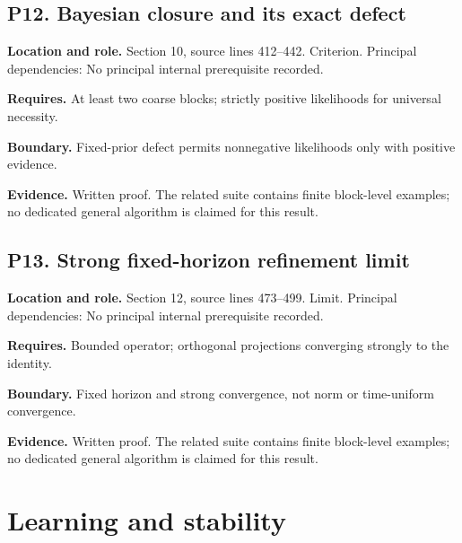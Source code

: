 \documentclass[11pt,letterpaper]{article}
\begin{document}
\par\noindent\begin{minipage}{\textwidth}
\subsection{P12. Bayesian closure and its exact
defect}\label{p12.-bayesian-closure-and-its-exact-defect}

\textbf{Location and role.} Section 10, source lines 412--442.
Criterion. Principal dependencies: No principal internal prerequisite
recorded.

\textbf{Requires.} At least two coarse blocks; strictly positive
likelihoods for universal necessity.

\textbf{Boundary.} Fixed-prior defect permits nonnegative likelihoods
only with positive evidence.

\textbf{Evidence.} Written proof. The related suite contains finite
block-level examples; no dedicated general algorithm is claimed for this
result.
\end{minipage}\par\medskip

\par\noindent\begin{minipage}{\textwidth}
\subsection{P13. Strong fixed-horizon refinement
limit}\label{p13.-strong-fixed-horizon-refinement-limit}

\textbf{Location and role.} Section 12, source lines 473--499. Limit.
Principal dependencies: No principal internal prerequisite recorded.

\textbf{Requires.} Bounded operator; orthogonal projections converging
strongly to the identity.

\textbf{Boundary.} Fixed horizon and strong convergence, not norm or
time-uniform convergence.

\textbf{Evidence.} Written proof. The related suite contains finite
block-level examples; no dedicated general algorithm is claimed for this
result.
\end{minipage}\par\medskip

\newpage

\section{Learning and stability}\label{learning-and-stability}
\end{document}
